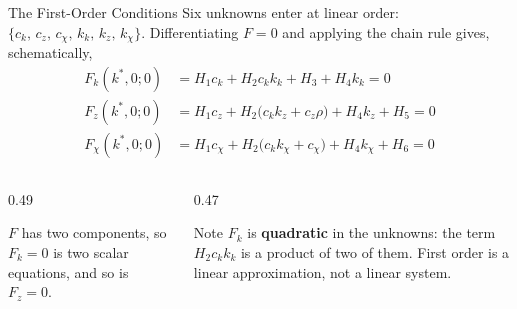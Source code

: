 \begin{frame}{The First-Order Conditions}
\small
Six unknowns enter at linear order: $\{c_k,\,c_z,\,c_\chi,\,k_k,\,k_z,\,k_\chi\}$. Differentiating $F=0$ and applying the chain rule gives, schematically,
\begin{align*}
F_{k}(k^{*},0;0) &= H_{1}c_{k}+H_{2}c_{k}k_{k}+H_{3}+H_{4}k_{k}=0\\
F_{z}(k^{*},0;0) &= H_{1}c_{z}+H_{2}\big(c_{k}k_{z}+c_{z}\rho\big)+H_{4}k_{z}+H_{5}=0\\
F_{\chi}(k^{*},0;0) &= H_{1}c_{\chi}+H_{2}\big(c_{k}k_{\chi}+c_{\chi}\big)+H_{4}k_{\chi}+H_{6}=0
\end{align*}
\medskip
\begin{columns}[T]
\begin{column}{0.49\textwidth}
\begin{conceptbox}[title=\textbf{Each line is a 2-vector}]\footnotesize
$F$ has two components, so $F_k=0$ is two scalar equations, and so is $F_z=0$.
\end{conceptbox}
\end{column}
\begin{column}{0.47\textwidth}
\begin{cautionbox}\footnotesize
Note $F_k$ is \textbf{quadratic} in the unknowns: the term $H_2 c_k k_k$ is a product of two of them. First order is a linear approximation, not a linear system.
\end{cautionbox}
\end{column}
\end{columns}
\vspace{1mm}
\end{frame}

